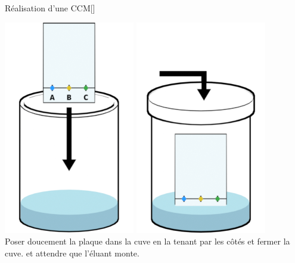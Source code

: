 \begin{doc}{Réalisation d'une CCM}[\label{doc:protocole_CCM}]
  \begin{multicols}{2}
    \begin{center}
      \includegraphics[height=0.2\textheight]{images/chimie/CCM/CCM_protocole0004.png}
      \includegraphics[height=0.2\textheight]{images/chimie/CCM/CCM_protocole0005.png} \\      
      Poser doucement la plaque dans la cuve en la tenant par les côtés et fermer la cuve.
       et attendre que l'éluant monte.
    \end{center}


\end{multicols}
\end{doc}
